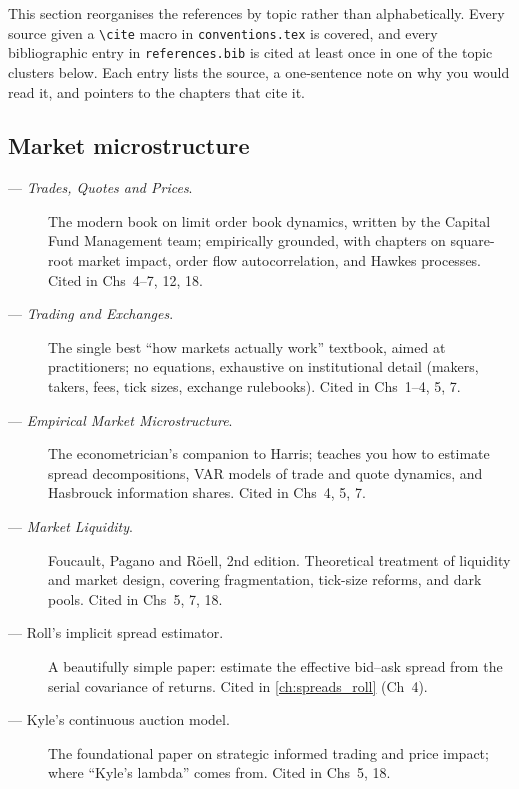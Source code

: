 This section reorganises the references by topic rather than
alphabetically. Every source given a \verb|\cite| macro in
\texttt{conventions.tex} is covered, and every bibliographic entry in
\texttt{references.bib} is cited at least once in one of the topic
clusters below. Each entry lists the source, a one-sentence note on
why you would read it, and pointers to the chapters that cite it.

\subsection{Market microstructure}
\label{sec:biblio_microstructure}

\begin{description}
  \item[\citet{bouchaud2018trades} --- \emph{Trades, Quotes and Prices}.]
    The modern book on limit order book dynamics, written by the
    Capital Fund Management team; empirically grounded, with chapters
    on square-root market impact, order flow autocorrelation, and
    Hawkes processes. Cited in Chs~4--7, 12, 18.
  \item[\citet{harris2003trading} --- \emph{Trading and Exchanges}.]
    The single best ``how markets actually work'' textbook, aimed at
    practitioners; no equations, exhaustive on institutional detail
    (makers, takers, fees, tick sizes, exchange rulebooks). Cited in
    Chs~1--4, 5, 7.
  \item[\citet{hasbrouck2007empirical} --- \emph{Empirical Market
    Microstructure}.] The econometrician's companion to Harris;
    teaches you how to estimate spread decompositions, VAR models of
    trade and quote dynamics, and Hasbrouck information shares. Cited
    in Chs~4, 5, 7.
  \item[\citet{foucault2024market} --- \emph{Market Liquidity}.]
    Foucault, Pagano and R\"oell, 2nd edition. Theoretical treatment
    of liquidity and market design, covering fragmentation, tick-size
    reforms, and dark pools. Cited in Chs~5, 7, 18.
  \item[\citet{roll1984simple} --- Roll's implicit spread estimator.]
    A beautifully simple paper: estimate the effective bid--ask spread
    from the serial covariance of returns. Cited in \cref{ch:spreads_roll}
    (Ch~4).
  \item[\citet{kyle1985continuous} --- Kyle's continuous auction
    model.] The foundational paper on strategic informed trading and
    price impact; where ``Kyle's lambda'' comes from. Cited in Chs~5,
    18.

\end{description}
